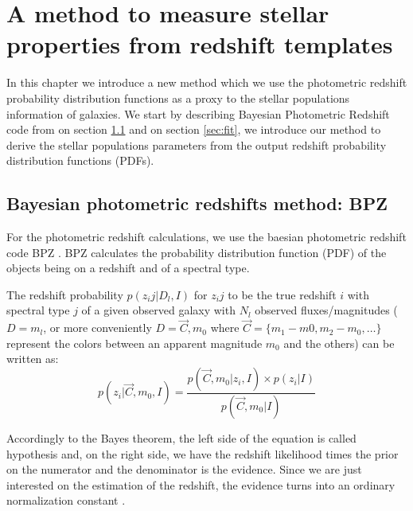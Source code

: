 \documentclass[9pt]{memoir}
\begin{document}
\chapter{A method to measure stellar properties from redshift templates}

In this chapter we introduce a new method which we use the photometric redshift probability distribution functions as a proxy to the stellar populations information of galaxies. We start by describing Bayesian Photometric Redshift code from \cite{Benitez.2000a} on section \ref{sec:bpz} and on section \ref{sec:fit}, we introduce our method to derive the stellar populations parameters from the output redshift probability distribution functions (PDFs).

%
%

\section{Bayesian photometric redshifts method: BPZ}
\label{sec:bpz}

For the photometric redshift calculations, we use the baesian photometric redshift code BPZ \citep{Benitez.2000a}. BPZ calculates the probability distribution function (PDF) of the objects being on a redshift and of a spectral type.

The redshift probability $p(z_ij|D_l,I)$ for $z_ij$ to be the true redshift $i$ with spectral type $j$ of a given observed galaxy with $N_l$ observed fluxes/magnitudes ($D = m_l$, or more conveniently $D = \vec{C}, m_0$ where $\vec{C} = \{m_1 - m0, m_2 - m_0, \ldots\}$ represent the colors between an apparent magnitude $m_0$ and the others)  can be written as:
\begin{equation}
p(z_i|\vec{C}, m_0,  I) = \frac{p(\vec{C}, m_0|z_i,I) \times p(z_i|I)}{p(\vec{C}, m_0|I)}
\end{equation}

Accordingly to the Bayes theorem, the left side of the equation is called hypothesis and, on the right side, we have the redshift likelihood times the prior on the numerator and the denominator is the evidence. Since we are just interested on the estimation of the redshift, the evidence turns into an ordinary normalization constant \citep{Sivia.Skilling.2006}.
\end{document}
